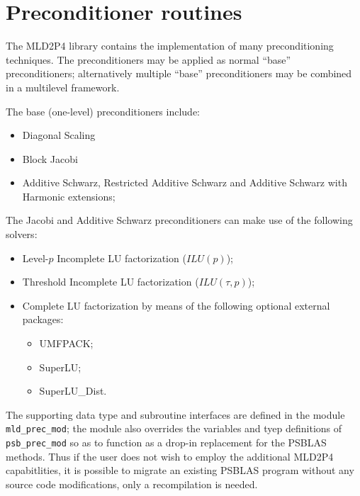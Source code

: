 \section{Preconditioner routines}
\label{sec:precs}

\label{sec:psprecs}
The MLD2P4 library  contains the implementation of many preconditioning
techniques. The preconditioners may be applied as normal ``base'' 
preconditioners; alternatively multiple ``base'' preconditioners may
be combined  in a multilevel framework. 

The base (one-level) preconditioners include: 
\begin{itemize}
\item Diagonal Scaling
\item Block Jacobi 
\item Additive Schwarz, Restricted Additive Schwarz and
  Additive Schwarz with Harmonic extensions;
\end{itemize}
The Jacobi and Additive Schwarz preconditioners can make use of the
following solvers:
\begin{itemize}
\item Level-$p$ Incomplete LU factorization ($ILU(p)$);
\item Threshold Incomplete LU factorization ($ILU(\tau,p)$);
\item Complete LU factorization by means of the following optional
  external   packages: 
\begin{itemize}
\item UMFPACK;
\item SuperLU;
\item SuperLU\_Dist.
\end{itemize}
\end{itemize}

The supporting data type and subroutine interfaces are defined in the
module  \verb|mld_prec_mod|; the module also overrides the variables
and tyep definitions of \verb|psb_prec_mod| so as to function as a
drop-in replacement for the PSBLAS methods. Thus if the user does not
wish to employ the additional MLD2P4 capabitlities, it is possible to
migrate an existing PSBLAS program without any source code
modifications, only a recompilation is needed. 





